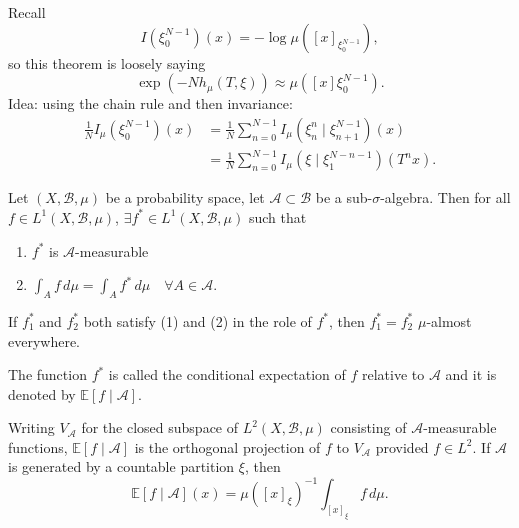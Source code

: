\documentclass{article}
\begin{document}
Recall
\begin{equation*}
  I(\xi_0^{N-1})(x) = -\log \mu([x]_{\xi_0^{N-1}}),
\end{equation*}
so this theorem is loosely saying
\begin{equation*}
  \exp(-N h_\mu(T,\xi)) \approx \mu([x]\xi_0^{N-1}).
\end{equation*}
Idea: using the chain rule and then invariance:
\begin{align*}
  \frac{1}{N} I_\mu(\xi_0^{N-1})(x) &= \frac{1}{N} \sum_{n=0}^{N-1} I_\mu(\xi_n^n \mid \xi_{n+1}^{N-1})(x) \\
                                    &= \frac{1}{N} \sum_{n=0}^{N-1} I_\mu(\xi \mid \xi_1^{N-n-1})(T^n x).
\end{align*}
\begin{defi}
  Let $(X,\mathcal{B},\mu)$ be a probability space, let $\mathcal{A} \subset \mathcal{B}$ be a sub-$\sigma$-algebra.
  Then for all $f \in L^1(X, \mathcal{B}, \mu)$, $\exists f^* \in L^1(X, \mathcal{B},\mu)$ such that
  \begin{enumerate}[label=(\arabic*)]
    \item $f^*$ is $\mathcal{A}$-measurable
    \item $\int_A f \, d\mu = \int_A f^* \, d\mu \quad \forall A \in \mathcal{A}$.
  \end{enumerate}

  If $f_1^*$ and $f_2^*$ both satisfy (1) and (2) in the role of $f^*$, then $f_1^* = f_2^*$ $\mu$-almost everywhere.

  The function $f^*$ is called the conditional expectation of $f$ relative to $\mathcal{A}$ and it is denoted by $\mathbb{E}[f \mid \mathcal{A}]$.
\end{defi}
\begin{remark}
  Writing $V_\mathcal{A}$ for the closed subspace of $L^2(X, \mathcal{B},\mu)$ consisting of $\mathcal{A}$-measurable functions, $\mathbb{E}[f \mid \mathcal{A}]$ is the orthogonal projection of $f$ to $V_\mathcal{A}$ provided $f \in L^2$.
  If $\mathcal{A}$ is generated by a countable partition $\xi$, then
  \begin{equation*}
    \mathbb{E}[f \mid \mathcal{A}] (x) = \mu([x]_\xi)^{-1} \int_{[x]_\xi}\! f \, d\mu.
  \end{equation*}
\end{remark}
\end{document}
